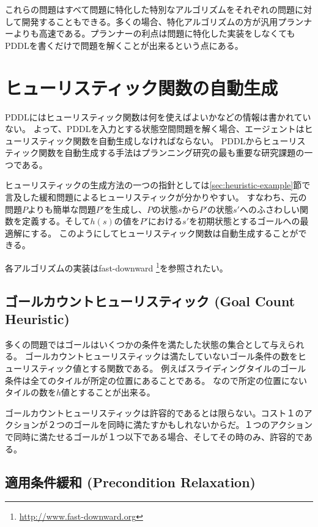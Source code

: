 これらの問題はすべて問題に特化した特別なアルゴリズムをそれぞれの問題に対して開発することもできる。多くの場合、特化アルゴリズムの方が汎用プランナーよりも高速である。プランナーの利点は問題に特化した実装をしなくてもPDDLを書くだけで問題を解くことが出来るという点にある。

\section{ヒューリスティック関数の自動生成}
\label{sec:automated-heuristic}

PDDLにはヒューリスティック関数は何を使えばよいかなどの情報は書かれていない。
よって、PDDLを入力とする状態空間問題を解く場合、エージェントはヒューリスティック関数を自動生成しなければならない。
PDDLからヒューリスティック関数を自動生成する手法はプランニング研究の最も重要な研究課題の一つである。

ヒューリスティックの生成方法の一つの指針としては\ref{sec:heuristic-example}節で言及した緩和問題によるヒューリスティックが分かりやすい。
すなわち、元の問題$P$よりも簡単な問題$P'$を生成し、$P$の状態$s$から$P'$の状態$s'$へのふさわしい関数を定義する。そして$h(s)$の値を$P'$における$s'$を初期状態とするゴールへの最適解にする。
このようにしてヒューリスティック関数は自動生成することができる。

各アルゴリズムの実装はfast-downward \footnote{\url{http://www.fast-downward.org}}を参照されたい。

\subsection{ゴールカウントヒューリスティック (Goal Count Heuristic)}

多くの問題ではゴールはいくつかの条件を満たした状態の集合として与えられる。
ゴールカウントヒューリスティックは満たしていないゴール条件の数をヒューリスティック値とする関数である。
例えばスライディングタイルのゴール条件は全てのタイルが所定の位置にあることである。
なので所定の位置にないタイルの数を$h$値とすることが出来る。

ゴールカウントヒューリスティックは許容的であるとは限らない。コスト１のアクションが２つのゴールを同時に満たすかもしれないからだ。１つのアクションで同時に満たせるゴールが１つ以下である場合、そしてその時のみ、許容的である。

\subsection{適用条件緩和 (Precondition Relaxation)}

